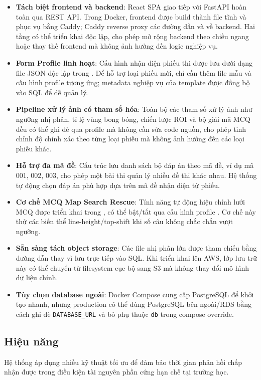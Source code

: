 \begin{itemize}[leftmargin=1.5cm]
  \item \textbf{Tách biệt frontend và backend}: React SPA giao tiếp với FastAPI hoàn toàn qua REST API. Trong Docker, frontend được build thành file tĩnh và phục vụ bằng Caddy; Caddy reverse proxy các đường dẫn  và  về backend. Hai tầng có thể triển khai độc lập, cho phép mở rộng backend theo chiều ngang hoặc thay thế frontend mà không ảnh hưởng đến logic nghiệp vụ.
  \item \textbf{Form Profile linh hoạt}: Cấu hình nhận diện phiếu thi được lưu dưới dạng file JSON độc lập trong . Để hỗ trợ loại phiếu mới, chỉ cần thêm file mẫu và cấu hình profile tương ứng; metadata nghiệp vụ của template được đồng bộ vào SQL để dễ quản lý.
  \item \textbf{Pipeline xử lý ảnh có tham số hóa}: Toàn bộ các tham số xử lý ảnh như ngưỡng nhị phân, tỉ lệ vùng bong bóng, chiến lược ROI và bộ giải mã MCQ đều có thể ghi đè qua profile mà không cần sửa code nguồn, cho phép tinh chỉnh độ chính xác theo từng loại phiếu mà không ảnh hưởng đến các loại phiếu khác.
  \item \textbf{Hỗ trợ đa mã đề}: Cấu trúc  lưu danh sách bộ đáp án theo mã đề, ví dụ mã 001, 002, 003, cho phép một bài thi quản lý nhiều đề thi khác nhau. Hệ thống tự động chọn đáp án phù hợp dựa trên mã đề nhận diện từ phiếu.
  \item \textbf{Cơ chế MCQ Map Search Rescue}: Tính năng tự động hiệu chỉnh lưới MCQ được triển khai trong , có thể bật/tắt qua cấu hình profile . Cơ chế này thử các biến thể line-height/top-shift khi số câu không chắc chắn vượt ngưỡng.
  \item \textbf{Sẵn sàng tách object storage}: Các file nhị phân lớn được tham chiếu bằng đường dẫn thay vì lưu trực tiếp vào SQL. Khi triển khai lên AWS, lớp lưu trữ này có thể chuyển từ filesystem cục bộ sang S3 mà không thay đổi mô hình dữ liệu chính.
  \item \textbf{Tùy chọn database ngoài}: Docker Compose cung cấp PostgreSQL để khởi tạo nhanh, nhưng production có thể dùng PostgreSQL bên ngoài/RDS bằng cách ghi đè \texttt{DATABASE\_URL} và bỏ phụ thuộc \texttt{db} trong compose override.
\end{itemize}

\subsection{Hiệu năng}
Hệ thống áp dụng nhiều kỹ thuật tối ưu để đảm bảo thời gian phản hồi chấp nhận được trong điều kiện tài nguyên phần cứng hạn chế tại trường học.

